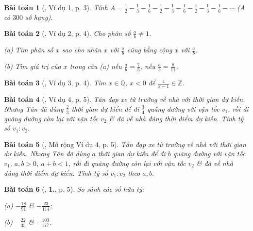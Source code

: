 \documentclass{article}
\numberwithin{equation}{section}
\newtheorem{baitoan}{Bài toán}[section]
\begin{document}
\begin{baitoan}[\cite{Binh_Toan_7_tap_1}, Ví dụ 1, p. 3]
	Tính $A = \frac{1}{2} - \frac{1}{3} - \frac{1}{6} - \frac{1}{2} - \frac{1}{3} - \frac{1}{6} - \frac{1}{2} - \frac{1}{3} - \frac{1}{6} - \cdots$ ($A$ có $300$ số hạng).
\end{baitoan}

\begin{baitoan}[\cite{Binh_Toan_7_tap_1}, Ví dụ 2, p. 4]
	Cho phân số $\frac{a}{b}\ne 1$.
	\begin{enumerate*}
		\item[(a)] Tìm phân số $x$ sao cho nhân $x$ với $\frac{a}{b}$ cũng bằng cộng $x$ với $\frac{a}{b}$.
		\item[(b)] Tìm giá trị của $x$ trong câu (a) nếu $\frac{a}{b} = \frac{7}{5}$, nếu $\frac{a}{b} = \frac{8}{11}$.
	\end{enumerate*}
\end{baitoan}

\begin{baitoan}[\cite{Binh_Toan_7_tap_1}, Ví dụ 3, p. 4]
	Tìm $x\in\mathbb{Q}$, $x < 0$ để $\frac{4}{x - 1}\in\mathbb{Z}$.
\end{baitoan}

\begin{baitoan}[\cite{Binh_Toan_7_tap_1}, Ví dụ 4, p. 5]
	Tân đạp xe từ trường về nhà với thời gian dự kiến. Nhưng Tân đã dùng $\frac{2}{3}$ thời gian dự kiến để đi $\frac{3}{4}$ quãng đường với vận tốc $v_1$, rồi đi quãng đường còn lại với vận tốc $v_2$ \& đã về nhà đúng thời điểm dự kiến. Tính tỷ số $v_1:v_2$.
\end{baitoan}

\begin{baitoan}[\cite{Binh_Toan_7_tap_1}, Mở rộng Ví dụ 4, p. 5]
	Tân đạp xe từ trường về nhà với thời gian dự kiến. Nhưng Tân đã dùng $a$ thời gian dự kiến để đi $b$ quãng đường với vận tốc $v_1$, $a,b > 0$, $a + b < 1$, rồi đi quãng đường còn lại với vận tốc $v_2$ \& đã về nhà đúng thời điểm dự kiến. Tính tỷ số $v_1:v_2$ theo $a,b$.
\end{baitoan}

\begin{baitoan}[\cite{Binh_Toan_7_tap_1}, \textbf{1.}, p. 5]
	So sánh các số hữu tỷ:
	\begin{enumerate*}
		\item[(a)] $-\frac{18}{91}$ \& $-\frac{23}{114}$;
		\item[(b)] $-\frac{22}{35}$ \& $-\frac{103}{177}$.
	\end{enumerate*}
\end{baitoan}
\end{document}
